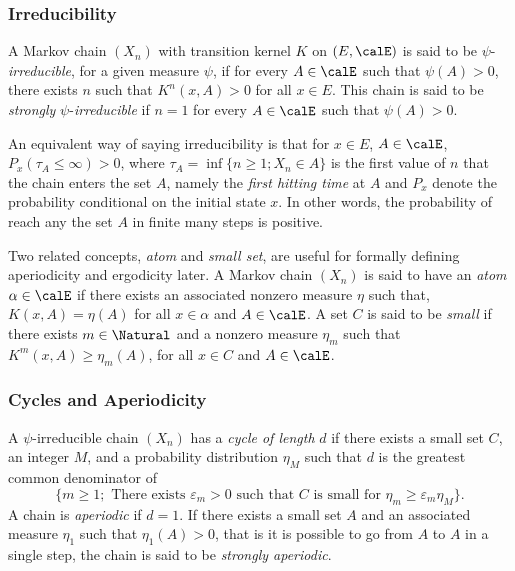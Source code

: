 \subsubsection{Irreducibility}
\label{ssub:Irreducibility}

A Markov chain $(X_n)$ with transition kernel $K$ on $(E,\calE)$ is said to be
$\psi$-\emph{irreducible}, for a given measure $\psi$, if for every
$A\in\calE$ such that $\psi(A)>0$, there exists $n$ such that $K^n(x,A)>0$ for
all $x\in E$. This chain is said to be \emph{strongly}
$\psi$-\emph{irreducible} if $n=1$ for every $A\in\calE$ such that
$\psi(A)>0$.

An equivalent way of saying irreducibility is that for $x\in E$, $A\in\calE$,
$P_x(\tau_A\le\infty) > 0$, where $\tau_A = \inf\{n\ge1;X_n\in A\}$ is the
first value of $n$ that the chain enters the set $A$, namely the \emph{first
  hitting time} at $A$ and $P_x$ denote the probability conditional on the
initial state $x$. In other words, the probability of reach any the set $A$ in
finite many steps is positive.


Two related concepts, \emph{atom} and \emph{small set}, are useful for
formally defining aperiodicity and ergodicity later. A Markov chain $(X_n)$ is
said to have an \emph{atom} $\alpha\in\calE$ if there exists an associated
nonzero measure $\eta$ such that, $K(x,A) = \eta(A)$ for all $x\in\alpha$ and
$A\in\calE$. A set $C$ is said to be \emph{small} if there exists
$m\in\Natural$ and a nonzero measure $\eta_m$ such that
$K^m(x,A)\ge\eta_m(A)$, for all $x\in C$ and $A\in\calE$.

\subsubsection{Cycles and Aperiodicity}
\label{ssub:Cycles and Aperiodicity}

A $\psi$-irreducible chain $(X_n)$ has a \emph{cycle of length} $d$ if there
exists a small set $C$, an integer $M$, and a probability distribution
$\eta_M$ such that $d$ is the greatest common denominator of
\begin{equation*}
  \{m\ge1;\text{ There exists }\varepsilon_m > 0\text{ such that }C\text{ is
    small for }\eta_m\ge\varepsilon_m\eta_M\}.
\end{equation*}
A chain is \emph{aperiodic} if $d = 1$. If there exists a small set $A$ and an
associated measure $\eta_1$ such that $\eta_1(A) > 0$, that is it is possible
to go from $A$ to $A$ in a single step, the chain is said to be
\emph{strongly aperiodic}.

